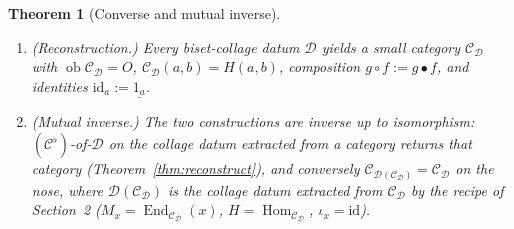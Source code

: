 \documentclass[11pt]{article}
\newtheorem{theorem}{Theorem}
\theoremstyle{definition}
\newcommand{\Hom}{\operatorname{Hom}}
\newcommand{\End}{\operatorname{End}}
\newcommand{\id}{\mathrm{id}}
\newcommand{\C}{\mathcal{C}}
\newcommand{\D}{\mathcal{D}}
\newcommand{\ob}{\operatorname{ob}}
\begin{document}
\begin{theorem}[Converse and mutual inverse]\label{thm:converse}
\leavevmode
\begin{enumerate}
\item \emph{(Reconstruction.)} Every biset-collage datum $\D$ yields a small
category $\C_\D$ with $\ob\C_\D=O$, $\C_\D(a,b)=H(a,b)$, composition
$g\circ f := g\bullet f$, and identities $\id_a := \underline{1_a}$.
\item \emph{(Mutual inverse.)} The two constructions are inverse up to
isomorphism: $(\C^{\flat})$-of-$\D$ on the collage datum extracted from a
category returns that category (Theorem~\ref{thm:reconstruct}), and conversely
$\C_{\D(\C_\D)} = \C_\D$ on the nose, where $\D(\C_\D)$ is the collage datum
extracted from $\C_\D$ by the recipe of Section~2 ($M_x=\End_{\C_\D}(x)$,
$H=\Hom_{\C_\D}$, $\iota_x=\id$).
\end{enumerate}
\end{theorem}
\end{document}
